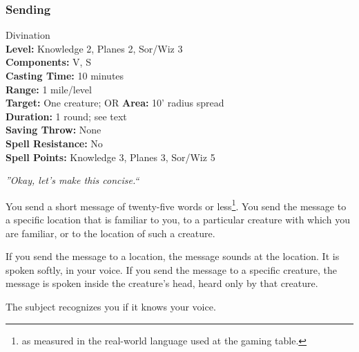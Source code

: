 \subsubsection{Sending}
\label{Spell:Sending}
Divination
\\ \textbf{Level:} Knowledge 2, Planes 2, Sor/Wiz 3
\\ \textbf{Components:} V, S
\\ \textbf{Casting Time:} 10 minutes
\\ \textbf{Range:} 1 mile/level
\\ \textbf{Target:} One creature; OR \textbf{Area:} 10' radius spread
\\ \textbf{Duration:} 1 round; see text
\\ \textbf{Saving Throw:} None
\\ \textbf{Spell Resistance:} No
\\ \textbf{Spell Points:} Knowledge 3, Planes 3, Sor/Wiz 5

\emph{''Okay, let's make this concise.``}


You send a short message of twenty-five words or less\footnote{as measured in the real-world language used at the gaming table.}. You send the message to a specific location that is familiar to you, to a particular creature with which you are familiar, or to the location of such a creature.

If you send the message to a location, the message sounds at the location. It is spoken softly, in your voice.
If you send the message to a specific creature, the message is spoken inside the creature's head, heard only by that creature.

The subject recognizes you if it knows your voice. 



